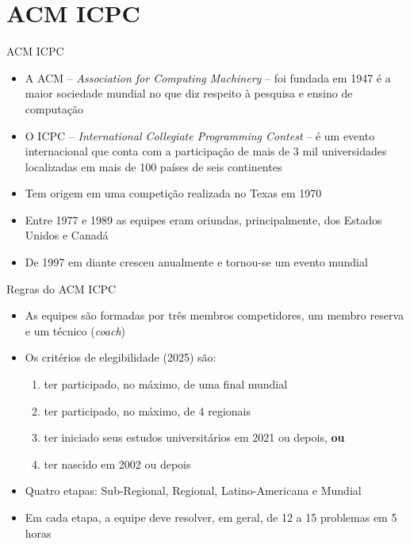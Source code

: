 \section{ACM ICPC}

\begin{frame}[fragile]{ACM ICPC}

    \begin{itemize}
        \item A ACM -- \textit{Association for Computing Machinery} -- foi fundada em 1947 é 
        a maior sociedade mundial no que diz respeito à pesquisa e ensino de computação
        \item O ICPC -- \textit{International Collegiate Programming Contest} -- é um evento
        internacional que conta com a participação de mais de 3 mil universidades localizadas em
        mais de 100 países de seis continentes
        \item Tem origem em uma competição realizada no Texas em 1970
        \item Entre 1977 e 1989 as equipes eram oriundas, principalmente, dos Estados Unidos e Canadá
        \item De 1997 em diante cresceu anualmente e tornou-se um evento mundial
    \end{itemize}

\end{frame}

\begin{frame}[fragile]{Regras do ACM ICPC}

    \begin{itemize}
        \item As equipes são formadas por três membros competidores, um membro reserva e um 
        técnico (\textit{coach})
        \item Os critérios de elegibilidade (2025) são:
            \begin{enumerate}
                \item ter participado, no máximo, de uma final mundial
                \item ter participado, no máximo, de 4 regionais
                \item ter iniciado seus estudos universitários em 2021 ou depois, \textbf{ou} 
                \item ter nascido em 2002 ou depois
            \end{enumerate}
        \item Quatro etapas: Sub-Regional, Regional, Latino-Americana e Mundial
        \item Em cada etapa, a equipe deve resolver, em geral, de 12 a 15 problemas em 5 horas
    \end{itemize}

\end{frame}


